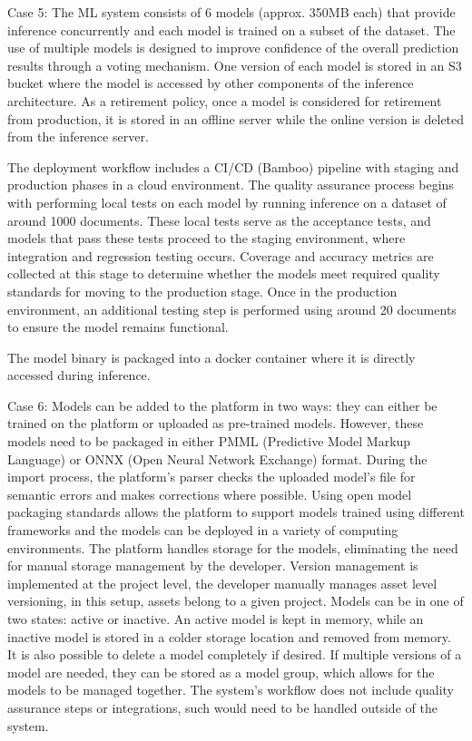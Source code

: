 Case 5: The ML system consists of 6 models (approx. 350MB each) that provide inference concurrently and each model is trained on a subset of the dataset. The use of multiple models is designed to improve confidence of the overall prediction results through a voting mechanism. One version of each model is stored in an S3 bucket where the model is accessed by other components of the inference architecture. As a retirement policy, once a model is considered for retirement from production, it is stored in an offline server while the online version is deleted from the inference server.

The deployment workflow includes a CI/CD (Bamboo) pipeline with staging and production phases in a cloud environment. The quality assurance process begins with performing local tests on each model by running inference on a dataset of around 1000 documents. These local tests serve as the acceptance tests, and models that pass these tests proceed to the staging environment, where integration and regression testing occurs. Coverage and accuracy metrics are collected at this stage to determine whether the models meet  required quality standards for moving to the production stage. Once in the production environment, an additional testing step is performed using around 20 documents to ensure the model remains functional.

The model binary is packaged into a docker container where it is directly accessed during inference.

Case 6: Models can be added to the platform in two ways: they can either be trained on the platform or uploaded as pre-trained models. However, these models need to be packaged in either PMML (Predictive Model Markup Language) or ONNX (Open Neural Network Exchange) format. During the import process, the platform's parser checks the uploaded model's file for semantic errors and makes corrections where possible. Using open model packaging standards allows the platform to support models trained using different frameworks and the models can be deployed in a variety of computing environments. The platform handles storage for the models, eliminating the need for manual storage management by the developer. Version management is implemented at the project level, the developer manually manages asset level versioning, in this setup, assets belong to a given project. Models can be in one of two states: active or inactive. An active model is kept in memory, while an inactive model is stored in a colder storage location and removed from memory. It is also possible to delete a model completely if desired. If multiple versions of a model are needed, they can be stored as a model group, which allows for the models to be managed together. The system’s workflow does not include quality assurance steps or integrations, such would need to be handled outside of the system.

